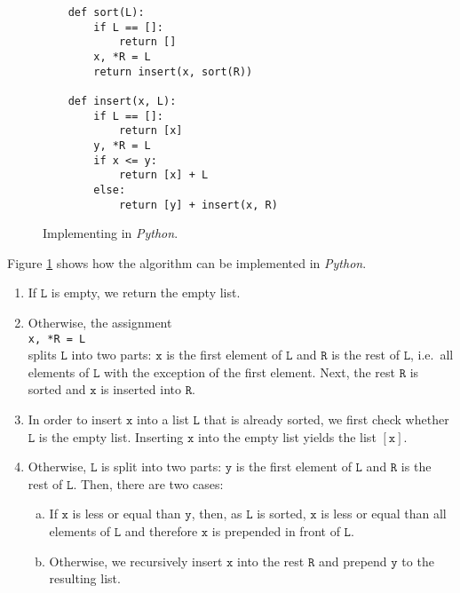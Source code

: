 \begin{figure}[!ht]
  \centering
\begin{verbatim}
    def sort(L):
        if L == []:
            return []
        x, *R = L
        return insert(x, sort(R))
        
    def insert(x, L):
        if L == []:
            return [x]
        y, *R = L
        if x <= y:
            return [x] + L
        else:
            return [y] + insert(x, R)
\end{verbatim}
\vspace*{-0.3cm}
  \caption{Implementing  in \textsl{Python}.}
  \label{fig:Insertion-Sort.ipynb}
\end{figure} 

\noindent
Figure \ref{fig:Insertion-Sort.ipynb} shows how the  algorithm can be implemented 
in \textsl{Python}.
\begin{enumerate}
\item If $\texttt{L}$ is empty, we return the empty list.
\item Otherwise, the assignment
      \\[0.2cm]
      \hspace*{1.3cm}
      \texttt{x, *R = L}
      \\[0.2cm]
      splits $\mathtt{L}$ into two parts: $\texttt{x}$ is the first element of $\texttt{L}$ and $\texttt{R}$ is the rest of $\texttt{L}$,
      i.e.~all elements of $\texttt{L}$ with the exception of the first element.  Next, the rest $\texttt{R}$
      is sorted and $\texttt{x}$ is inserted into $\texttt{R}$.
\item In order to insert $\texttt{x}$ into a list $\texttt{L}$ that is already sorted, we first check whether
      $\texttt{L}$ is the empty list.  Inserting $\texttt{x}$ into the empty list yields the list $[\texttt{x}]$.
\item Otherwise, $\texttt{L}$ is split into two parts: $\texttt{y}$ is the first element of $\texttt{L}$ and
      $\texttt{R}$ is the rest of $\texttt{L}$. 
      Then, there are two cases:
      \begin{enumerate}[(a)]
      \item If $\texttt{x}$ is less or equal than $\texttt{y}$, then, as $\texttt{L}$ is sorted,  $\texttt{x}$
            is less or equal than all elements of $\texttt{L}$ and therefore $\texttt{x}$ is prepended in front
            of $\texttt{L}$. 
      \item Otherwise, we recursively insert $\texttt{x}$ into the rest $\texttt{R}$ and prepend $\texttt{y}$
            to the resulting list.     
      \end{enumerate}
\end{enumerate}

